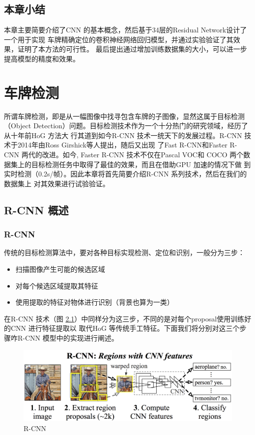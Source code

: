 \section{本章小结}

本章主要简要介绍了CNN 的基本概念，然后基于34层的Residual Network设计了一个用于实现
车牌精确定位的卷积神经网络回归模型，并通过实验验证了其效果，证明了本方法的可行性。
最后提出通过增加训练数据集的大小，可以进一步提高模型的精度和效果。

\chapter{车牌检测}

所谓车牌检测，即是从一幅图像中找寻包含车牌的子图像，显然这属于目标检测（Object
Detection）问题。目标检测技术作为一个十分热门的研究领域，经历了从十年前HoG 方法大
行其道到如今R-CNN 技术一统天下的发展过程。R-CNN 技术于2014年由Ross Girshick等人提出，随后又出现
了Fast R-CNN和Faster R-CNN 两代的改进。如今, Faster R-CNN 技术不仅在Pascal VOC和
COCO 两个数据集上的目标检测任务中取得了最佳的效果，而且在借助GPU 加速的情况下做
到实时检测（0.2s/帧）。因此本章将首先简要介绍R-CNN 系列技术，然后在我们的数据集上
对其效果进行试验验证。

\section{R-CNN 概述}

\subsection{R-CNN}

传统的目标检测算法中，要对各种目标实现检测、定位和识别，一般分为三步：

\begin{itemize}
  \item 扫描图像产生可能的候选区域
  \item 对每个候选区域提取其特征
  \item 使用提取的特征对物体进行识别（背景也算为一类）
\end{itemize}

在R-CNN 技术（图 \ref{Fig:RCNN}）中同样分为这三步，不同的是对每个proposal使用训练好的CNN 进行特征提取以
取代HoG 等传统手工特征。下面我们将分别对这三个步骤咋R-CNN 模型中的实现进行阐述。

\begin{figure}
  \centering
  \includegraphics[width=1.0\linewidth]{./Figure/RCNN.png}
  \caption{R-CNN\cite{Girshick:2014jx}}\label{Fig:RCNN}
\end{figure}


